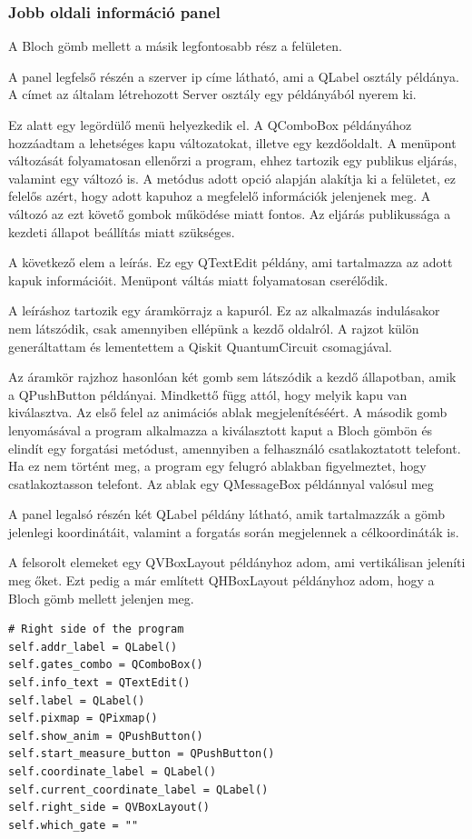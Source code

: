 \documentclass[
]{thesis-ekf}
\theoremstyle{definition}
\theoremstyle{remark}
\begin{document}
\subsubsection{Jobb oldali információ panel}
A Bloch gömb mellett a másik legfontosabb rész a felületen.

A panel legfelső részén a szerver ip címe látható, ami a QLabel osztály példánya. A címet az általam létrehozott Server osztály egy példányából nyerem ki.

Ez alatt egy legördülő menü helyezkedik el. A QComboBox példányához hozzáadtam a lehetséges kapu változatokat, illetve egy kezdőoldalt. A menüpont változását folyamatosan ellenőrzi a program, ehhez tartozik egy publikus eljárás, valamint egy változó is. A metódus adott opció alapján alakítja ki a felületet, ez felelős azért, hogy adott kapuhoz a megfelelő információk jelenjenek meg. A változó az ezt követő gombok működése miatt fontos. Az eljárás publikussága a kezdeti állapot beállítás miatt szükséges.

A következő elem a leírás. Ez egy QTextEdit példány, ami tartalmazza az adott kapuk információit. Menüpont váltás miatt folyamatosan cserélődik.

A leíráshoz tartozik egy áramkörrajz a kapuról. Ez az alkalmazás indulásakor nem látszódik, csak amennyiben ellépünk a kezdő oldalról. A rajzot külön generáltattam és lementettem a Qiskit QuantumCircuit csomagjával.

Az áramkör rajzhoz hasonlóan két gomb sem látszódik a kezdő állapotban, amik a QPushButton példányai. Mindkettő függ attól, hogy melyik kapu van kiválasztva. Az első felel az animációs ablak megjelenítéséért. A második gomb lenyomásával a program alkalmazza a kiválasztott kaput a Bloch gömbön és elindít egy forgatási metódust, amennyiben a felhasználó csatlakoztatott telefont. Ha ez nem történt meg, a program egy felugró ablakban figyelmeztet, hogy csatlakoztasson telefont. Az ablak egy QMessageBox példánnyal valósul meg

A panel legalsó részén két QLabel példány látható, amik tartalmazzák a gömb jelenlegi koordinátáit, valamint a forgatás során megjelennek a célkoordináták is.

A felsorolt elemeket egy QVBoxLayout példányhoz adom, ami vertikálisan jeleníti meg őket. Ezt pedig a már említett QHBoxLayout példányhoz adom, hogy a Bloch gömb mellett jelenjen meg.

\begin{lstlisting}[caption={A jobb oldali panel és elemeinek létrehozása a konstruktorban}]
# Right side of the program
self.addr_label = QLabel()
self.gates_combo = QComboBox()
self.info_text = QTextEdit()
self.label = QLabel()
self.pixmap = QPixmap()
self.show_anim = QPushButton()
self.start_measure_button = QPushButton()
self.coordinate_label = QLabel()
self.current_coordinate_label = QLabel()
self.right_side = QVBoxLayout()
self.which_gate = ""
\end{lstlisting}
\end{document}
